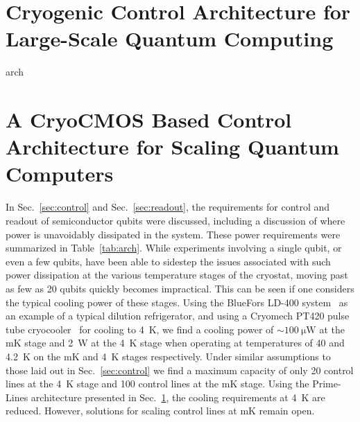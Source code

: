 \clearpage
\section{Cryogenic Control Architecture for Large-Scale Quantum Computing}
\label{sec:primelines}
{arch}

\clearpage
\section[A CryoCMOS Based Control Architecture for Scaling Quantum Computers]{A CryoCMOS Based Control Architecture for Scaling Quantum Computers}
\label{sec:gooseberry}
\begingroup
  \addtocounter{footnote}{-1}
  \renewcommand\thefootnote{}
\endgroup

In Sec.~\ref{sec:control} and Sec.~\ref{sec:readout}, the requirements for control and readout of semiconductor qubits were discussed, including a discussion
of where power is unavoidably dissipated in the system. These power requirements were summarized in Table~\ref{tab:arch}. While experiments involving a single qubit, or even a few qubits, have been able to sidestep the issues associated with such power dissipation at the various temperature stages of the cryostat, moving past as few as 20 qubits quickly becomes impractical. This can be seen if one considers the typical cooling power of these stages. Using the BlueFors LD-400 system~\cite{bluefors}
as an example of a typical dilution refrigerator, and using a Cryomech PT420 pulse tube cryocooler~\cite{cryomech} for cooling
to \SI{4}{\kelvin}, we find a cooling power of $\sim \SI{100}{\micro\watt}$ at the mK stage and \SI{2}{\watt} at the \SI{4}{\kelvin} stage when operating at
temperatures of \SI{40}{\mk} and \SI{4.2}{\kelvin} on the mK and \SI{4}{\kelvin} stages respectively. Under similar assumptions to those laid out in Sec.~\ref{sec:control} we find a maximum capacity of only 20 control lines at the \SI{4}{\kelvin} stage and 100 control lines at the mK stage. Using the Prime-Lines architecture presented in Sec.~\ref{sec:primelines}, the cooling requirements at \SI{4}{\kelvin} are reduced. However, solutions for scaling control lines at mK remain open.

